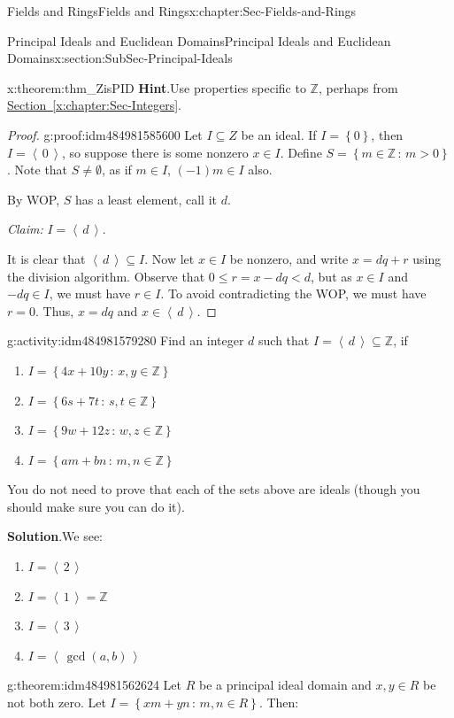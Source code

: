\documentclass[oneside,10pt,]{book}
\newcommand{\blocktitlefont}{\relax}
\newcommand{\xreffont}{\relax}
\numberwithin{equation}{section}
\renewcommand{\le}{\leqslant}
\newcommand{\ideal}[1]{\left\langle\, #1 \,\right\rangle}
\newcommand{\set}[1]{\left\{ {#1} \right\}}
\newcommand{\setof}[2]{{\left\{#1\,\colon\,#2\right\}}}
\def\Z{{\mathbb Z}}
\newcommand{\lt}{<}
\begin{document}
\begin{chapterptx}{Fields and Rings}{}{Fields and Rings}{}{}{x:chapter:Sec-Fields-and-Rings}
\begin{sectionptx}{Principal Ideals and Euclidean Domains}{}{Principal Ideals and Euclidean Domains}{}{}{x:section:SubSec-Principal-Ideals}
\begin{theorem}{}{}{x:theorem:thm_ZisPID}
\textbf{\blocktitlefont Hint}.\quad{}Use properties specific to \(\Z\), perhaps from \hyperref[x:chapter:Sec-Integers]{Section~{\xreffont\ref{x:chapter:Sec-Integers}}}.%
\end{theorem}
\begin{proof}{}{g:proof:idm484981585600}
Let \(I\subseteq Z\) be an ideal. If \(I = \set{0}\), then \(I = \ideal{0}\), so suppose there is some nonzero \(x\in I\). Define \(S = \setof{m\in \Z}{m > 0}\). Note that \(S\ne \emptyset\), as if \(m\in I\), \((-1)m \in I\) also.%
\par
By WOP, \(S\) has a least element, call it \(d\).%
\par
\emph{Claim:} \(I = \ideal{d}\).%
\par
It is clear that \(\ideal{d}\subseteq I\). Now let \(x\in I\) be nonzero, and write \(x = dq + r\) using the division algorithm. Observe that \(0 \le r = x - dq \lt d\), but as \(x\in I\) and \(-dq \in I\), we must have \(r\in I\). To avoid contradicting the WOP, we must have \(r = 0\). Thus, \(x = dq\) and \(x\in \ideal{d}\).%
\end{proof}
\begin{activity}{}{g:activity:idm484981579280}%
Find an integer \(d\) such that \(I = \ideal{d}\subseteq \Z\), if%
\begin{enumerate}
\item{}\(I = \setof{4x+10y}{x,y\in\Z}\)%
\item{}\(I = \setof{6s+7t}{s,t\in\Z}\)%
\item{}\(I = \setof{9w+12z}{w,z\in\Z}\)%
\item{}\(I = \setof{am+bn}{m,n\in\Z}\)%
\end{enumerate}
%
\par
You do not need to prove that each of the sets above are ideals (though you should make sure you can do it).%
\par\smallskip%
\noindent\textbf{\blocktitlefont Solution}.\hypertarget{g:solution:idm484981567856}{}\quad{}We see:%
\begin{enumerate}
\item{}\(I= \ideal{2}\)%
\item{}\(I = \ideal{1} = \Z\)%
\item{}\(I = \ideal{3}\)%
\item{}\(I = \ideal{\gcd(a,b)}\)%
\end{enumerate}
%
\end{activity}
\begin{theorem}{}{}{g:theorem:idm484981562624}%
Let \(R\) be a principal ideal domain and \(x,y\in R\) be not both zero. Let \(I = \setof{xm+yn}{m,n\in R}\). Then:%

\end{theorem}
\end{sectionptx}
\end{chapterptx}
\end{document}
